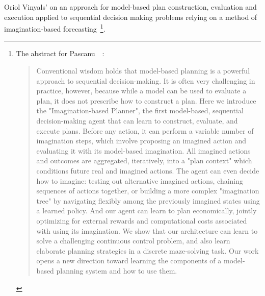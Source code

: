 Oriol Vinyals' {} on an approach for model-based plan construction, evaluation and execution applied to sequential decision making problems relying on a method of imagination-based forecasting~\cite{PascanuetalCoRR-17}\footnote{%
%
  The abstract for Pascanu~\etal{}~\cite{PascanuetalCoRR-17}:
%
  \begin{quotation}
%
   Conventional wisdom holds that model-based planning is a powerful approach to sequential decision-making. It is often very challenging in practice, however, because while a model can be used to evaluate a plan, it does not prescribe how to construct a plan. Here we introduce the "Imagination-based Planner", the first model-based, sequential decision-making agent that can learn to construct, evaluate, and execute plans. Before any action, it can perform a variable number of imagination steps, which involve proposing an imagined action and evaluating it with its model-based imagination. All imagined actions and outcomes are aggregated, iteratively, into a "plan context" which conditions future real and imagined actions. The agent can even decide how to imagine: testing out alternative imagined actions, chaining sequences of actions together, or building a more complex "imagination tree" by navigating flexibly among the previously imagined states using a learned policy. And our agent can learn to plan economically, jointly optimizing for external rewards and computational costs associated with using its imagination. We show that our architecture can learn to solve a challenging continuous control problem, and also learn elaborate planning strategies in a discrete maze-solving task. Our work opens a new direction toward learning the components of a model-based planning system and how to use them.  
%
  \end{quotation}}.

